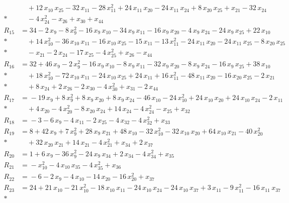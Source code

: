 \begin{align*}
&\quad{} +12\,x_{10}\,x_{25} -32\,x_{11} -28\,x_{11}^{2} +24\,x_{11}\,x_{20} -24\,x_{11}\,x_{24} +8\,x_{20}\,x_{25} +x_{21} -32\,x_{24} \\*
&\quad{} -4\,x_{24}^{2} -x_{26} +x_{30} +x_{44} \\[3pt]
R_{15} &={} 34 -2\,x_{9} -8\,x_{9}^{2} -16\,x_{9}\,x_{10} -34\,x_{9}\,x_{11} -16\,x_{9}\,x_{20} -4\,x_{9}\,x_{24} -24\,x_{9}\,x_{25} +22\,x_{10} \\*
&\quad{} +14\,x_{10}^{2} -36\,x_{10}\,x_{11} -16\,x_{10}\,x_{25} -15\,x_{11} -13\,x_{11}^{2} -24\,x_{11}\,x_{20} -24\,x_{11}\,x_{25} -8\,x_{20}\,x_{25} \\*
&\quad{} -x_{21} -2\,x_{24} -17\,x_{25} -4\,x_{25}^{2} +x_{26} -x_{44} \\[3pt]
R_{16} &={} 32 +46\,x_{9} -2\,x_{9}^{2} -16\,x_{9}\,x_{10} -8\,x_{9}\,x_{11} -32\,x_{9}\,x_{20} -8\,x_{9}\,x_{24} -16\,x_{9}\,x_{25} +38\,x_{10} \\*
&\quad{} +18\,x_{10}^{2} -72\,x_{10}\,x_{11} -24\,x_{10}\,x_{25} +24\,x_{11} +16\,x_{11}^{2} -48\,x_{11}\,x_{20} -16\,x_{20}\,x_{25} -2\,x_{21} \\*
&\quad{} +8\,x_{24} +2\,x_{26} -2\,x_{30} -4\,x_{30}^{2} +x_{31} -2\,x_{44} \\[3pt]
R_{17} &={} -19\,x_{9} +8\,x_{9}^{2} +8\,x_{9}\,x_{20} +8\,x_{9}\,x_{24} -46\,x_{10} -24\,x_{10}^{2} +24\,x_{10}\,x_{20} +24\,x_{10}\,x_{24} -2\,x_{11} \\*
&\quad{} +4\,x_{20} -4\,x_{20}^{2} -8\,x_{20}\,x_{24} +14\,x_{24} -4\,x_{24}^{2} -x_{25} +x_{32} \\[3pt]
R_{18} &={} -3 -6\,x_{9} -4\,x_{11} -2\,x_{25} -4\,x_{32} -4\,x_{32}^{2} +x_{33} \\[3pt]
R_{19} &={} 8 +42\,x_{9} +7\,x_{9}^{2} +28\,x_{9}\,x_{21} +48\,x_{10} -32\,x_{10}^{2} -32\,x_{10}\,x_{20} +64\,x_{10}\,x_{21} -40\,x_{20}^{2} \\*
&\quad{} +32\,x_{20}\,x_{21} +14\,x_{21} -4\,x_{21}^{2} +x_{34} +2\,x_{37} \\[3pt]
R_{20} &={} 1 +6\,x_{9} -36\,x_{9}^{2} -24\,x_{9}\,x_{34} +2\,x_{34} -4\,x_{34}^{2} +x_{35} \\[3pt]
R_{21} &={} -x_{10}^{2} -4\,x_{10}\,x_{35} -4\,x_{35}^{2} +x_{36} \\[3pt]
R_{22} &={} -6 -2\,x_{9} -4\,x_{10} -14\,x_{20} -16\,x_{20}^{2} +x_{37} \\[3pt]
R_{23} &={} 24 +21\,x_{10} -21\,x_{10}^{2} -18\,x_{10}\,x_{11} -24\,x_{10}\,x_{24} -24\,x_{10}\,x_{37} +3\,x_{11} -9\,x_{11}^{2} -16\,x_{11}\,x_{37} \\*

\end{align*}
